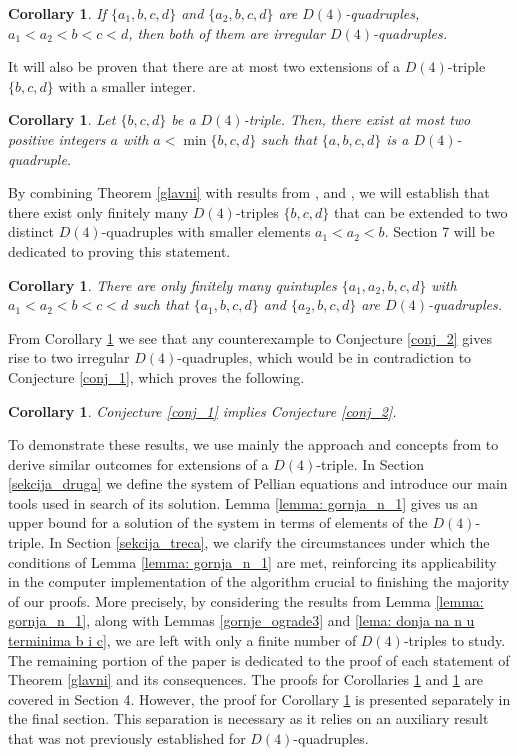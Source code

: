 \documentclass[12pt]{amsart}%
\newtheorem{cor}[theorem]{Corollary}
\theoremstyle{definition}
\theoremstyle{remark}
\theoremstyle{plain}
\begin{document}
\begin{cor}\label{cor: nereg}
   If $\{a_1,b,c,d\}$ and $\{a_2,b,c,d\}$ are $D(4)$-quadruples, $a_1<a_2<b<c<d$, then both of them are irregular $D(4)$-quadruples.
\end{cor}

It will also be proven that there are at most two extensions of a $D(4)$-triple $\{b, c, d\}$ with a smaller integer.

\begin{cor}\label{cor: najvisedva}
    Let $\{b, c, d\}$ be a $D(4)$-triple. Then, there exist at most two positive integers $a$ with $a < \min\{b,c,d\}$ such that $\{a,b,c,d\}$ is a $D(4)$-quadruple.
\end{cor}

By combining Theorem \ref{glavni} with results from \cite{mbt}, \cite{duje_kon} and \cite{fil_xy4}, we will establish that there exist only finitely many $D(4)$-triples $\{b, c, d\}$ that can be extended to two distinct $D(4)$-quadruples with smaller elements $a_1 < a_2 < b$. Section 7 will be dedicated to proving this statement.

\begin{cor}\label{cor: konacno}
    There are only finitely many quintuples $\{a_1, a_2, b, c, d\}$ with
$a_1 < a_2 < b < c < d$ such that $\{a_1, b, c, d\}$ and $\{a_2, b, c, d\}$ are 
$D(4)$-quadruples.
\end{cor}

From Corollary \ref{cor: nereg} we see that any counterexample to Conjecture \ref{conj_2} gives rise to two irregular $D(4)$-quadruples, which would be in contradiction to Conjecture \ref{conj_1}, which proves the following.
\begin{cor}\label{cor: conject}
Conjecture \ref{conj_1} implies Conjecture \ref{conj_2}.
\end{cor}


To demonstrate these results, we use mainly the approach and concepts from \cite{cdf2} to derive similar outcomes for extensions of a $D(4)$-triple. In Section \ref{sekcija_druga} we define the system of Pellian equations and introduce our main tools used in search of its solution.  Lemma \ref{lemma: gornja_n_1} gives us an upper bound for a solution of the system in terms of elements of the $D(4)$-triple.  
In Section \ref{sekcija_treca}, we clarify the circumstances under which the conditions of Lemma \ref{lemma: gornja_n_1} are met, reinforcing its applicability in the computer implementation of the algorithm crucial to finishing the majority of our proofs. 
More precisely, by considering the results from Lemma \ref{lemma: gornja_n_1}, along with Lemmas \ref{gornje_ograde3} and \ref{lema: donja na n u terminima b i c}, we are left with only a finite number of $D(4)$-triples to study. The remaining portion of the paper is dedicated to the proof of each statement of Theorem \ref{glavni} and its consequences. The proofs for Corollaries \ref{cor: nereg} and \ref{cor: najvisedva} are covered in Section 4. However, the proof for Corollary \ref{cor: konacno} is presented separately in the final section. This separation is necessary as it relies on an auxiliary result that was not previously established for $D(4)$-quadruples.
\end{document}
